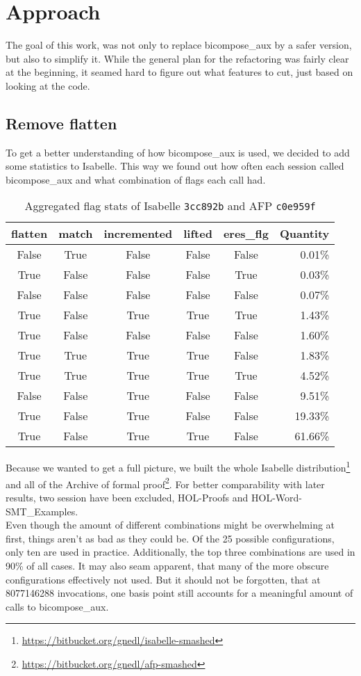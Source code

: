 \chapter{Approach}\label{chapter:approach}

The goal of this work, was not only to replace bicompose\_aux by a safer version, but also to simplify it. While the general plan for the refactoring was fairly clear at the beginning, it seamed hard to figure out what features to cut, just based on looking at the code.

\section{Remove flatten}

To get a better understanding of how bicompose\_aux is used, we decided to add some statistics to Isabelle. This way we found out how often each session called bicompose\_aux and what combination of flags each call had.

\begin{table}[ht]
\caption{Aggregated flag stats of Isabelle \texttt{3cc892b} and AFP \texttt{c0e959f}}
\begin{tabular}{*{5}{c} r}
flatten & match & incremented & lifted & eres\_flg & Quantity\\ \hline
False & True & False & False & False & 0.01\%\\
True & False & False & False & True & 0.03\%\\
False & False & False & False & False & 0.07\%\\
True & False & True & True & True & 1.43\%\\
True & False & False & False & False & 1.60\%\\
True & True & True & True & False & 1.83\%\\
True & True & True & True & True & 4.52\%\\
False & False & True & False & False & 9.51\%\\
True & False & True & False & False & 19.33\%\\
True & False & True & True & False & 61.66\%\\
\end{tabular}
\label{tab:agg_baseline}
\centering
\end{table}

Because we wanted to get a full picture, we built the whole Isabelle distribution\footnote{\url{https://bitbucket.org/gnedl/isabelle-smashed}} and all of the Archive of formal proof\footnote{\url{https://bitbucket.org/gnedl/afp-smashed}}. For better comparability with later results, two session have been excluded, HOL-Proofs and HOL-Word-SMT\_Examples.\\
Even though the amount of different combinations might be overwhelming at first, things aren't as bad as they could be. Of the 25 possible configurations, only ten are used in practice. Additionally, the top three combinations are used in 90\% of all cases. It may also seam apparent, that many of the more obscure configurations effectively not used. But it should not be forgotten, that at 8077146288 invocations, one basis point still accounts for a meaningful amount of calls to bicompose\_aux.

